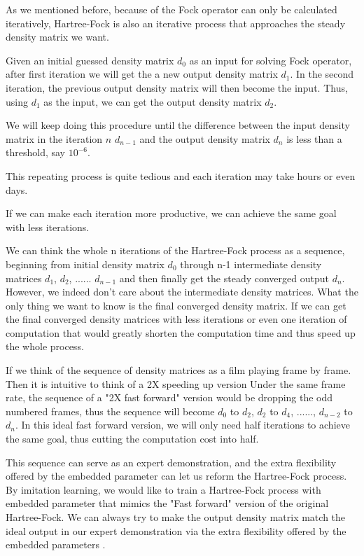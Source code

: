 \documentclass[twoside]{article}
\begin{document}
As we mentioned before,  because of the Fock operator can only be calculated iteratively, Hartree-Fock is also an iterative process that  approaches the steady density matrix we want.

Given an initial guessed density matrix $d_0$ as an input for solving Fock operator, after first iteration we will get the a new output density matrix $d_1$. 
In the second iteration, the previous output density matrix will then become the input. Thus, using $d_1$ as the input, we can get the output density matrix $d_2$. 

We will keep doing this procedure until the difference between the input density matrix in the iteration $n$ $d_{n-1}$  and the output density matrix $d_n$ is less than a threshold, say $10^{-6}$. 

This repeating process is quite tedious and each iteration may take hours or even days. %

If we can make each iteration more productive, we can achieve the same goal with less iterations. 

We can think the whole n iterations of the Hartree-Fock process as a sequence, beginning from initial density matrix $d_0$ through n-1 intermediate density matrices $d_1$,  $d_2$,  ...... $d_{n-1}$ and then finally get the steady converged output $d_{n}$. However, we indeed don't care about the intermediate density matrices. What the only thing we want to know is the final converged density matrix. If we can get the final converged density matrices with less iterations or even one iteration of computation that would greatly shorten the computation time and thus speed up the whole process. 

If we think of the sequence of density matrices as a film playing frame by frame. Then it is intuitive to think of a 2X speeding up version 
Under the same frame rate, the sequence of a  "2X fast forward" version would be dropping the odd numbered frames, thus the sequence will become $d_0$ to $d_2$, $d_2$ to $d_4$, ......, $d_{n-2}$ to $d_n$. In this ideal fast forward version, we will only need half iterations to achieve the same goal, thus cutting the computation cost into half.


This sequence can serve as an expert demonstration, and the extra flexibility offered by the embedded parameter can let us reform the Hartree-Fock process. By imitation learning,
we would like to train a Hartree-Fock process with embedded parameter that  mimics the "Fast forward" version of the original Hartree-Fock. 
We can always try to make the output density matrix match the ideal output in our expert demonstration via the extra flexibility offered by the embedded parameters .
\end{document}
